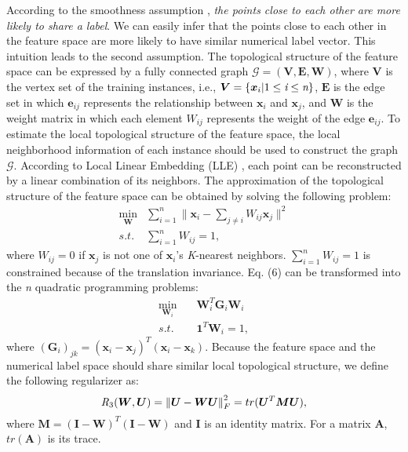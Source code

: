\documentclass[conference]{IEEEtran}
\begin{document}
According to the smoothness assumption \cite{zhu2005semi}, \emph{the points close to each other are more likely to share a label}. We can easily infer that the points close to each other in the feature space are more likely to have similar numerical label vector. This intuition leads to the second assumption. The topological structure of the feature space can be expressed by a fully connected graph $\mathcal{G}=(\bm{V}, \bm{E}, \bm{W})$, where $\bm{V}$ is the vertex set of the training instances, i.e., $\bm{V} = \{\bm{x}_i | 1 \leq \emph{i} \leq \emph{n}\}$, $\bm{E}$ is the edge set in which $\bm{e}_{ij}$ represents the relationship between $\bm{x}_i$ and $\bm{x}_j$, and $\bm{W}$ is the weight matrix in which each element $W_{ij}$ represents the weight of the edge $\bm{e}_{ij}$. To estimate the local topological structure of the feature space, the local neighborhood information of each instance should be used to construct the graph $\mathcal{G}$. According to Local Linear Embedding (LLE) \cite{roweis2000nonlinear}, each point can be reconstructed by a linear combination of its neighbors. The approximation of the topological structure of the feature space can be obtained by solving the following problem:
\begin{equation}
\begin{split}
\mathop{\min }\limits_{\bm{W}} &\sum_{i=1}^n\Big\| \bm{x}_i - \sum_{j\not=i}W_{ij}\bm{x}_j \Big\|^2  \\s.t. &\sum_{i=1}^nW_{ij} = 1,
\end{split}
\end{equation}
where $W_{ij} = 0$ if $\bm{x}_j$ is not one of $\bm{x}_i$'s \emph{K}-nearest neighbors. $\sum_{i=1}^nW_{ij} = 1$ is constrained because of the translation invariance. Eq. (6) can be transformed into the \emph{n} quadratic programming problems:
\begin{equation}
\begin{split}
\mathop{\min}\limits_{\bm{W}_i}\quad&\bm{W}_i^T\bm{G}_i\bm{W}_i\\
s.t.\quad&\bm{1}^T\bm{W}_i=1,
\end{split}
\end{equation}
where $(\bm{G}_i)_{jk}=(\bm{x}_i-\bm{x}_j)^T(\bm{x}_i-\bm{x}_k)$. Because the feature space and the numerical label space should share similar local topological structure, we define the following regularizer as:
\begin{equation}
\emph{R}_{3}(\bm{W}, \bm{U}) = \left\lVert \bm{U} - \bm{WU} \right\rVert_F^2 = tr(\bm{U}^T\bm{M}\bm{U}),
\end{equation}
where $\bm{M}=(\bm{I} - \bm{W})^T(\bm{I} - \bm{W})$ and $\bm{I}$ is an identity matrix. For a matrix $\bm{A}$, $tr(\bm{A})$ is its trace.
\end{document}
